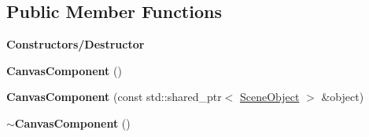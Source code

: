 \subsection*{Public Member Functions}
\begin{Indent}\textbf{ Constructors/\+Destructor}\par
\begin{DoxyCompactItemize}
\item 
\mbox{\label{classrev_1_1_canvas_component_a6747334c92ba516a6a2bdd41afc86dd0}} 
{\bfseries Canvas\+Component} ()
\item 
\mbox{\label{classrev_1_1_canvas_component_a6e8b70ba07f2fcc805fe6872c3a93cae}} 
{\bfseries Canvas\+Component} (const std\+::shared\+\_\+ptr$<$ \mbox{\hyperlink{classrev_1_1_scene_object}{Scene\+Object}} $>$ \&object)
\item 
\mbox{\label{classrev_1_1_canvas_component_a7f0522a03a393d735cf65d0063541942}} 
{\bfseries $\sim$\+Canvas\+Component} ()
\end{DoxyCompactItemize}
\end{Indent}
